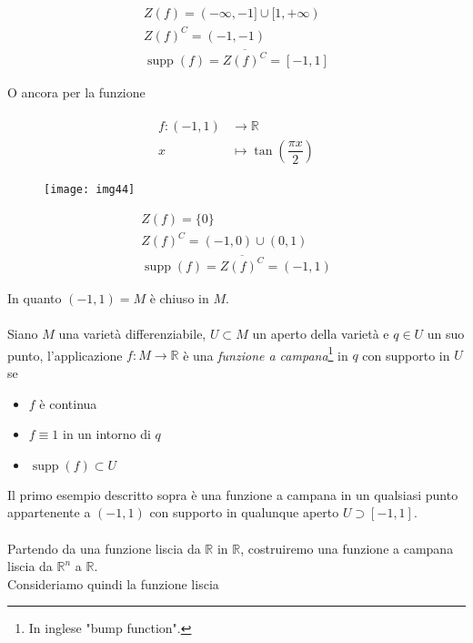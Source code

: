 \begin{gather}
	Z(f) = (-\infty,-1] \cup [1,+\infty)\\
	Z(f)^{C} = (-1,-1)\\
	\operatorname{supp}(f) = \overline{Z(f)^{C}} = [-1,1]
\end{gather}

O ancora per la funzione

\begin{align}
	\begin{split}
		f : (-1,1) &\to \mathbb{R}\\
		x &\mapsto \tan(\dfrac{\pi x}{2})
	\end{split}
\end{align}

\begin{figure}[H]
	\centering
	\texttt{[image: img44]}
\end{figure}

\begin{gather}
	Z(f) = \{0\}\\
	Z(f)^{C} = (-1,0) \cup (0,1)\\
	\operatorname{supp}(f) = \overline{Z(f)^{C}} = (-1,1)
\end{gather}

In quanto $ (-1,1) = M $ è chiuso in $ M $.\\\\
%
Siano $ M $ una varietà differenziabile, $ U \subset M $ un aperto della varietà e $ q \in U $ un suo punto, l'applicazione $ f : M \to \mathbb{R} $ è una \textit{funzione a campana}\footnote{%
	In inglese "bump function".%
} in $ q $ con supporto in $ U $ se

\begin{itemize}
	\item $ f $ è continua
	
	\item $ f \equiv 1 $ in un intorno di $ q $
	
	\item $ \operatorname{supp}(f) \subset U $
\end{itemize}

Il primo esempio descritto sopra è una funzione a campana in un qualsiasi punto appartenente a $ (-1,1) $ con supporto in qualunque aperto $ U \supset [-1,1] $.\\\\
%
Partendo da una funzione liscia da $ \mathbb{R} $ in $ \mathbb{R} $, costruiremo una funzione a campana liscia da $ \mathbb{R}^{n} $ a $ \mathbb{R} $.\\
Consideriamo quindi la funzione liscia

